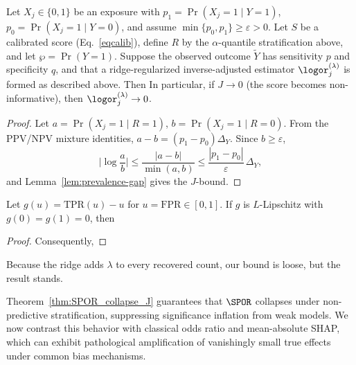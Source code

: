 \documentclass[lineno]{biometrika}
\begin{document}
\begin{theorem}\label{thm:SPOR_collapse_J}
Let \(X_j\in\{0,1\}\) be an exposure with
\(p_1=\Pr(X_j{=}1\mid Y{=}1)\), \(p_0=\Pr(X_j{=}1\mid Y{=}0)\),
and assume \(\min\{p_0,p_1\}\ge\varepsilon>0\).
Let \(S\) be a calibrated score (Eq.~\eqref{eqcalib}),
define \(R\) by the \(\alpha\)-quantile stratification above, and let \(\wp=\Pr(Y=1)\).
Suppose the observed outcome \(\tilde Y\) has sensitivity \(p\) and specificity \(q\),
and that a ridge-regularized inverse-adjusted estimator
\(\logor^{(\lambda)}_j\) is formed as described above. 
Then
In particular, if \(J\to 0\) (the score becomes non-informative),
then \(\logor^{(\lambda)}_j\to 0\).
\end{theorem}
\begin{proof}
Let \(a=\Pr(X_j{=}1\mid R{=}1)\), \(b=\Pr(X_j{=}1\mid R{=}0)\).
From the PPV/NPV mixture identities,
\(a-b=(p_1-p_0)\Delta_Y\). Since \(b\ge\varepsilon\),
\[
\Big|\log\frac{a}{b}\Big|
\le \frac{|a-b|}{\min(a,b)}
\le \frac{|p_1-p_0|}{\varepsilon}\,\Delta_Y,
\]
and Lemma~\ref{lem:prevalence-gap} gives the \(J\)-bound.
\end{proof}

\begin{corollary}\label{cor:auc_lipschitz}
  Let \(g(u)=\mathrm{TPR}(u)-u\) for \(u=\mathrm{FPR}\in[0,1]\).
If \(g\) is \(L\)-Lipschitz with \(g(0)=g(1)=0\), then
\end{corollary}

  \begin{proof}
Consequently,
\end{proof}
Because the ridge adds $\lambda$ to every recovered count, our bound is loose, but the result stands.

Theorem~\ref{thm:SPOR_collapse_J} guarantees that $\SPOR$ collapses under non-predictive stratification, suppressing significance inflation from weak models. We now contrast this behavior with classical odds ratio and mean-absolute SHAP, which can exhibit pathological amplification of vanishingly small true effects under common bias mechanisms. 
\end{document}
